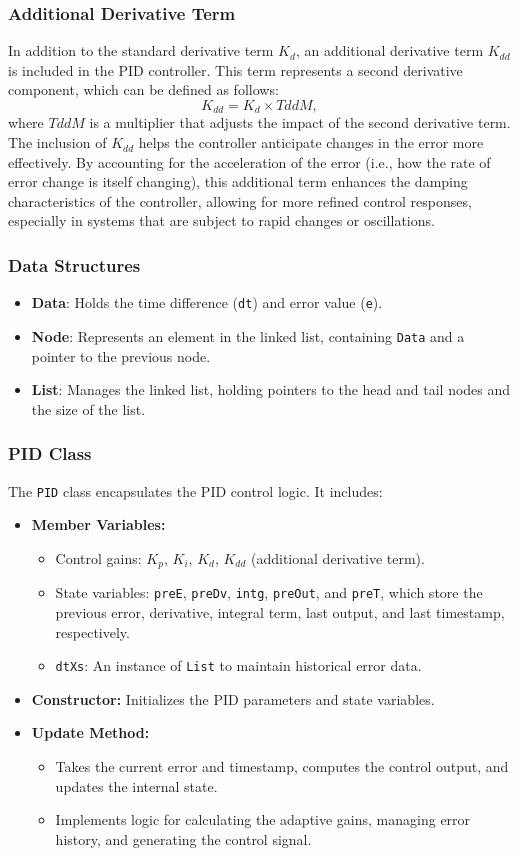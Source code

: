 \documentclass[a4paper,12pt]{./article}
\begin{document}
\subsubsection{Additional Derivative Term}
In addition to the standard derivative term $K_d$, an additional derivative term $K_{dd}$ is included in the PID controller. This term represents a second derivative component, which can be defined as follows:
$$
K_{dd} = K_d \times TddM,
$$
where $TddM$ is a multiplier that adjusts the impact of the second derivative term. \\
The inclusion of $K_{dd}$ helps the controller anticipate changes in the error more effectively. By accounting for the acceleration of the error (i.e., how the rate of error change is itself changing), this additional term enhances the damping characteristics of the controller, allowing for more refined control responses, especially in systems that are subject to rapid changes or oscillations.
\subsubsection{Data Structures}
\begin{itemize}
\item \textbf{Data}: Holds the time difference (\texttt{dt}) and error value (\texttt{e}).
\item \textbf{Node}: Represents an element in the linked list, containing \texttt{Data} and a pointer to the previous node.
\item \textbf{List}: Manages the linked list, holding pointers to the head and tail nodes and the size of the list.
\end{itemize}
\subsubsection{PID Class}
The \texttt{PID} class encapsulates the PID control logic. It includes:
\begin{itemize}
\item \textbf{Member Variables:}
\begin{itemize}
\item Control gains: $K_p$, $K_i$, $K_d$, $K_{dd}$ (additional derivative term).
\item State variables: \texttt{preE}, \texttt{preDv}, \texttt{intg}, \texttt{preOut}, and \texttt{preT}, which store the previous error, derivative, integral term, last output, and last timestamp, respectively.
\item \texttt{dtXs}: An instance of \texttt{List} to maintain historical error data.
\end{itemize}
\item \textbf{Constructor:} Initializes the PID parameters and state variables.
\item \textbf{Update Method:}
\begin{itemize}
\item Takes the current error and timestamp, computes the control output, and updates the internal state.
\item Implements logic for calculating the adaptive gains, managing error history, and generating the control signal.
\end{itemize}
\end{itemize}
\end{document}
